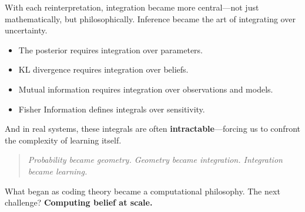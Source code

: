 With each reinterpretation, integration became more central—not just mathematically, but philosophically. Inference became the art of integrating over uncertainty.

\begin{itemize}
  \item The posterior requires integration over parameters.
  \item KL divergence requires integration over beliefs.
  \item Mutual information requires integration over observations and models.
  \item Fisher Information defines integrals over sensitivity.
\end{itemize}

And in real systems, these integrals are often \textbf{intractable}—forcing us to confront the complexity of learning itself.

\begin{quote}
\emph{Probability became geometry. Geometry became integration. Integration became learning.}
\end{quote}

What began as coding theory became a computational philosophy.  
The next challenge? \textbf{Computing belief at scale.}
